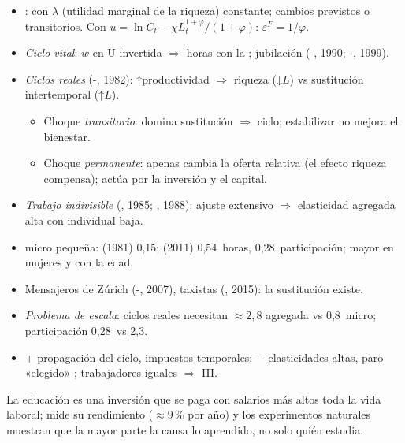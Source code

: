 \documentclass{article}
\begin{document}
\begin{columnas}
\begin{itemize}
\item {}: con $\lambda$ (utilidad marginal de la riqueza) constante; cambios previstos o transitorios. Con $u=\ln C_t-\chi L_t^{1+\varphi}/(1+\varphi)$: $\varepsilon^F=1/\varphi$.
\item \emph{Ciclo vital}: $w$ en U invertida $\Rightarrow$ horas con la ; jubilación (-, 1990; -, 1999).
\item \emph{Ciclos reales} (-, 1982): ↑productividad $\Rightarrow$ riqueza (↓$L$) vs sustitución intertemporal (↑$L$).
  \begin{itemize}
  \item Choque \emph{transitorio}: domina sustitución $\Rightarrow$ ciclo; estabilizar no mejora el bienestar.
  \item Choque \emph{permanente}: apenas cambia la oferta relativa (el efecto riqueza compensa); actúa por la inversión y el capital.
  \end{itemize}
\item \emph{Trabajo indivisible} (, 1985; , 1988): ajuste extensivo $\Rightarrow$ elasticidad agregada alta con individual baja.
\end{itemize}

\begin{itemize}
\item {} micro pequeña:  (1981) 0,15;  (2011) 0,54~horas, 0,28~participación; mayor en mujeres y con la edad.
\item Mensajeros de Zúrich (-, 2007), taxistas (, 2015): la sustitución existe.
\item \emph{Problema de escala}: ciclos reales necesitan $\approx2{,}8$ agregada vs 0,8~micro; participación 0,28~vs 2,3.
\end{itemize}

\begin{itemize}
\item + propagación del ciclo, impuestos temporales; $-$ elasticidades altas, paro «elegido» ; trabajadores iguales $\Rightarrow$ \hyperref[rep:III]{III}.
\end{itemize}

\begin{ideaclave}
La educación es una inversión que se paga con salarios más altos toda la vida laboral;  mide su rendimiento ($\approx9$\,\% por año) y los experimentos naturales muestran que la mayor parte la causa lo aprendido, no solo quién estudia.
\end{ideaclave}


\end{columnas}
\end{document}
